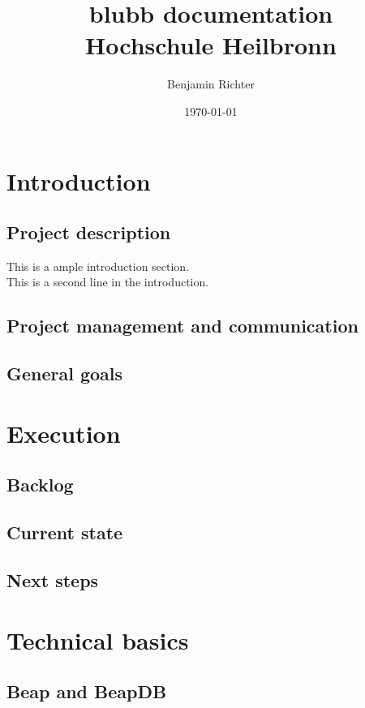 \documentclass[11pt,a4paper,oneside]{report}
\begin{document}
\title{
	{\huge blubb documentation}
	{\\ \large Hochschule Heilbronn}
}
\author{Benjamin Richter}
\date{\today}
\maketitle
\tableofcontents

\chapter{Introduction}
\section{Project description}
This is a ample introduction section.\\
This is a second line in the introduction.\\

\section{Project management and communication}

\section{General goals}

\chapter{Execution}

\section{Backlog}

\section{Current state}

\section{Next steps}

\chapter{Technical basics}

\section{Beap and BeapDB}
\end{document}
